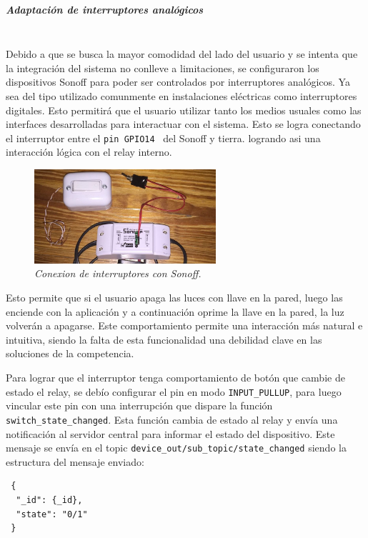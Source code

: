 \subparagraph{Adaptación de interruptores analógicos}\mbox{}\\

Debido a que se busca la mayor comodidad del lado del usuario y se intenta que la integración del sistema no conlleve a limitaciones, se configuraron los dispositivos Sonoff para poder ser controlados por interruptores analógicos. Ya sea del tipo utilizado comunmente en instalaciones eléctricas como interruptores digitales.
Esto permitirá que el usuario utilizar tanto los medios usuales como las interfaces desarrolladas para interactuar con el sistema. Esto se logra conectando el interruptor entre el \lstinline[columns=fixed]{pin GPIO14}~ del Sonoff y tierra. logrando asi una interacción lógica con el relay interno.

\begin{figure}[h]
  \centering
  \includegraphics[width=0.6\textwidth, keepaspectratio]{images/sonoff-switch}
  \caption{\textit{Conexion de interruptores con Sonoff.}}
  \label{fig:sonoff-interruptor}
\end{figure}

Esto permite que si el usuario apaga las luces con llave en la pared, luego las enciende con la aplicación y a continuación oprime la llave en la pared, la luz volverán a apagarse.
Este comportamiento permite una interacción más natural e intuitiva, siendo la falta de esta funcionalidad una debilidad clave en las soluciones de la competencia.

Para lograr que el interruptor tenga comportamiento de botón que cambie de estado el relay, se debío configurar el pin en modo \lstinline[columns=fixed]{INPUT_PULLUP}, para luego vincular este pin con una interrupción que dispare la función \lstinline[columns=fixed]{switch_state_changed}.
Esta función cambia de estado al relay y envía una notificación al servidor central para informar el estado del dispositivo. Este mensaje se envía en el topic \lstinline[columns=fixed]{device_out/sub_topic/state_changed} siendo la estructura del mensaje enviado:

\begin{lstlisting}
 {
  "_id": {_id},
  "state": "0/1"
 }
\end{lstlisting}

